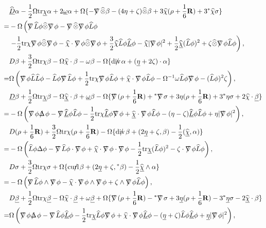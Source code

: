 \documentclass[11pt,reqno]{amsart}
\theoremstyle{definition}
\numberwithin{equation}{section}
\newcommand{\tr}{\mathrm{tr}}
\def\betab{\underline{\beta}}
\def\chib{\underline{\chi}}
\def\chibh{\widehat{\underline{\chi}}}
\def\chih{\widehat{\chi}}
\def\etab{\underline{\eta}}
\def\tr{\mathrm{tr}}
\def\omegab{\underline{\omega}}
\def\tensor{\widehat{\otimes}}
\def\Lh{\widehat{L}}
\def\Lbh{\widehat{\underline{L}}}
\newcommand{\Db}{\underline{D}}
\newcommand{\Dbh}{\widehat{\underline{D}}}
\def\nablas{\mbox{$\nabla \mkern -13mu /$ }}
\def\Deltas{\mbox{$\Delta \mkern -13mu /$ }}
\def\divs{\mbox{$\mathrm{div} \mkern -13mu /$ }}
\def\curls{\mbox{$\mathrm{curl} \mkern -13mu /$ }}
\def\ds{\mbox{$\nabla \mkern -13mu /$ }}
\begin{document}
\begin{align*}
&\Dbh\alpha-\frac{1}{2}\Omega\tr\chib \alpha+2\omegab\alpha+\Omega\{-\nablas\tensor\beta -(4\eta+\zeta)\tensor \beta+3\chih (\rho+\frac{1}{6}\mathbf{R})+3{}^*\chih \sigma\}
\\=&-\Omega\left(\nablas\Lh\phi\tensor\ds\phi-\nablas\tensor\ds\phi\Lh\phi\right.\\
&\left.-\frac{1}{2}\tr\chi\ds\phi\tensor\ds\phi-\chih\cdot\ds\phi\tensor\ds\phi+\frac{3}{2}\chih\Lh\phi\Lbh\phi-\chih|\ds\phi|^2+\frac{1}{2}\chibh(\Lh\phi)^2+\zeta\tensor\ds\phi\Lh\phi\right),\\
&D\beta+\frac{3}{2}\Omega\tr\chi\beta-\Omega\chih\cdot\beta-\omega\beta-\Omega\{\divs\alpha+(\etab+2\zeta)\cdot\alpha\}\\
=&\Omega\left(\ds\phi\Lh\Lh\phi-\Lh\phi\nablas\Lh\phi+\frac{1}{2}\tr\chi\ds\phi\Lh\phi+\chih\cdot\ds\phi\Lh\phi-\Omega^{-1}\omega\Lh\phi\ds\phi-(\Lh\phi)^2\zeta\right),\\
&\Db\beta+\frac{1}{2}\Omega\tr\chib\beta-\Omega\chibh \cdot \beta+\omegab \beta-\Omega\{\ds (\rho+\frac{1}{6}\mathbf{R})+{}^*\ds \sigma+3\eta(\rho+\frac{1}{6}\mathbf{R})+3{}^*\eta\sigma+2\chih\cdot\betab\}\\
=&-\Omega\left(\ds\phi\Deltas\phi-\nablas\Lbh\phi\Lh\phi-\frac{1}{2}\tr\chi\Lbh\phi\ds\phi+\chibh\cdot\ds\phi\Lh\phi-(\eta-\zeta)\Lbh\phi\Lh\phi+\eta|\ds\phi|^2\right),\\
&D(\rho+\frac{1}{6}\mathbf{R})+\frac{3}{2}\Omega\tr\chi (\rho+\frac{1}{6}\mathbf{R})-\Omega\{\divs \beta+(2\etab+\zeta,\beta)-\frac{1}{2}(\chibh,\alpha)\}\\=&-\Omega\left(\Lh\phi\Delta\phi-\nablas\Lh\phi\cdot\ds\phi+\chih\cdot\ds\phi\cdot\ds\phi-\frac{1}{2}\tr\chib(\Lh\phi)^2-\zeta\cdot\ds\phi\Lh\phi\right),\\
&D\sigma+\frac{3}{2}\Omega\tr\chi\sigma+\Omega\{\curls\beta+(2\etab+\zeta,{}^*\beta)-\frac{1}{2}\chibh\wedge\alpha\}\\
=&-\Omega\left(\nablas\Lh\phi\wedge\ds\phi-\chih\cdot\ds\phi\wedge\ds\phi+\zeta\wedge\ds\phi\Lh\phi\right),\\
&D\betab+\frac{1}{2}\Omega\tr\chi\betab-\Omega\chih \cdot \betab+\omega \betab+\Omega\{\ds (\rho+\frac{1}{6}\mathbf{R})-{}^*\ds \sigma+3\etab(\rho+\frac{1}{6}\mathbf{R})-3{}^*\etab\sigma-2\chibh\cdot\beta\}\\
=&\Omega\left(\ds\phi\Deltas\phi-\nablas\Lh\phi\Lbh\phi-\frac{1}{2}\tr\chib\Lh\phi\ds\phi+\chih\cdot\ds\phi\Lbh\phi-(\etab+\zeta)\Lh\phi\Lbh\phi+\etab|\ds\phi|^2\right),\\

\end{align*}
\end{document}
